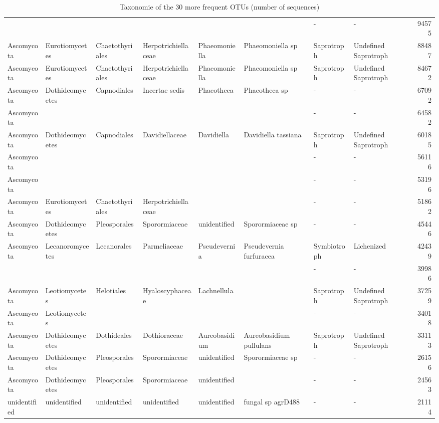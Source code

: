 \documentclass[12pt]{article}\usepackage[]{graphicx}\usepackage[]{color}
\numberwithin{figure}{section}
\begin{document}
\begin{landscape}
\begin{table}[ht]
\begin{tabular}{llllllllr}
   &  &  &  &  &  & - & - & 94575 \\ 
  Ascomycota & Eurotiomycetes & Chaetothyriales & Herpotrichiellaceae & Phaeomoniella & Phaeomoniella sp & Saprotroph & Undefined Saprotroph & 88487 \\ 
  Ascomycota & Eurotiomycetes & Chaetothyriales & Herpotrichiellaceae & Phaeomoniella & Phaeomoniella sp & Saprotroph & Undefined Saprotroph & 84672 \\ 
  Ascomycota & Dothideomycetes & Capnodiales & Incertae sedis & Phaeotheca & Phaeotheca sp & - & - & 67092 \\ 
  Ascomycota &  &  &  &  &  & - & - & 64582 \\ 
  Ascomycota & Dothideomycetes & Capnodiales & Davidiellaceae & Davidiella & Davidiella tassiana & Saprotroph & Undefined Saprotroph & 60185 \\ 
  Ascomycota &  &  &  &  &  & - & - & 56116 \\ 
  Ascomycota &  &  &  &  &  & - & - & 53196 \\ 
  Ascomycota & Eurotiomycetes & Chaetothyriales & Herpotrichiellaceae &  &  & - & - & 51862 \\ 
  Ascomycota & Dothideomycetes & Pleosporales & Sporormiaceae & unidentified & Sporormiaceae sp & - & - & 45446 \\ 
  Ascomycota & Lecanoromycetes & Lecanorales & Parmeliaceae & Pseudevernia & Pseudevernia furfuracea & Symbiotroph & Lichenized & 42439 \\ 
   &  &  &  &  &  & - & - & 39986 \\ 
  Ascomycota & Leotiomycetes & Helotiales & Hyaloscyphaceae & Lachnellula &  & Saprotroph & Undefined Saprotroph & 37259 \\ 
  Ascomycota & Leotiomycetes &  &  &  &  & - & - & 34018 \\ 
  Ascomycota & Dothideomycetes & Dothideales & Dothioraceae & Aureobasidium & Aureobasidium pullulans & Saprotroph & Undefined Saprotroph & 33113 \\ 
  Ascomycota & Dothideomycetes & Pleosporales & Sporormiaceae & unidentified & Sporormiaceae sp & - & - & 26156 \\ 
  Ascomycota & Dothideomycetes & Pleosporales & Sporormiaceae & unidentified &  & - & - & 24563 \\ 
  unidentified & unidentified & unidentified & unidentified & unidentified & fungal sp agrD488 & - & - & 21114 \\ 
   \hline
\end{tabular}
\endgroup
\caption{Taxonomie of the 30 more
             frequent OTUs (number of sequences)} 
\end{table}

\end{landscape}
\end{document}
